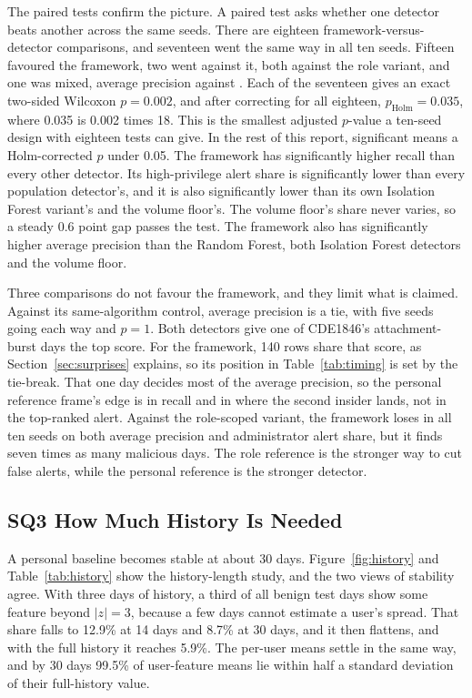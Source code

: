 \documentclass[a4paper,12pt]{article}
\begin{document}
The paired tests confirm the picture. A paired test asks whether one detector beats another across the same seeds. There are eighteen framework-versus-detector comparisons, and seventeen went the same way in all ten seeds. Fifteen favoured the framework, two went against it, both against the role variant, and one was mixed, average precision against . Each of the seventeen gives an exact two-sided Wilcoxon $p = 0.002$, and after correcting for all eighteen, $p_{\text{Holm}} = 0.035$, where 0.035 is 0.002 times 18. This is the smallest adjusted $p$-value a ten-seed design with eighteen tests can give. In the rest of this report, significant means a Holm-corrected $p$ under 0.05. The framework has significantly higher recall than every other detector. Its high-privilege alert share is significantly lower than every population detector's, and it is also significantly lower than its own Isolation Forest variant's and the volume floor's. The volume floor's share never varies, so a steady 0.6 point gap passes the test. The framework also has significantly higher average precision than the Random Forest, both Isolation Forest detectors and the volume floor.

Three comparisons do not favour the framework, and they limit what is claimed. Against its same-algorithm control, average precision is a tie, with five seeds going each way and $p = 1$. Both detectors give one of CDE1846's attachment-burst days the top score. For the framework, 140 rows share that score, as Section~\ref{sec:surprises} explains, so its position in Table~\ref{tab:timing} is set by the tie-break. That one day decides most of the average precision, so the personal reference frame's edge is in recall and in where the second insider lands, not in the top-ranked alert. Against the role-scoped variant, the framework loses in all ten seeds on both average precision and administrator alert share, but it finds seven times as many malicious days. The role reference is the stronger way to cut false alerts, while the personal reference is the stronger detector.

\subsection{SQ3 How Much History Is Needed}
\label{sec:sq3}
A personal baseline becomes stable at about 30 days. Figure~\ref{fig:history} and Table~\ref{tab:history} show the history-length study, and the two views of stability agree. With three days of history, a third of all benign test days show some feature beyond $|z|=3$, because a few days cannot estimate a user's spread. That share falls to 12.9\% at 14 days and 8.7\% at 30 days, and it then flattens, and with the full history it reaches 5.9\%. The per-user means settle in the same way, and by 30 days 99.5\% of user-feature means lie within half a standard deviation of their full-history value.
\end{document}
